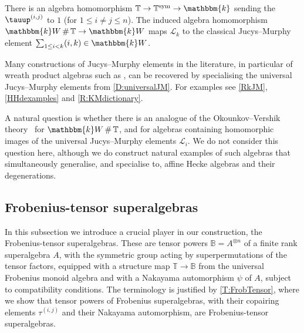 \documentclass[a4paper,11pt]{amsart}
\numberwithin{equation}{subsection}
\theoremstyle{definition}
\theoremstyle{theorem}
\theoremstyle{remark}
\newcommand\CL{\mathcal{L}}
\newcommand\Sym{W}
\newcommand\op{\operatorname}
\newcommand{\ttau}{\tauup}
\newcommand\kk{\mathbbm{k}}
\newcommand\Tos{\mathbb{T}}
\newcommand\Tosym{\mathbb{T}^{\op{sym}}}
\newcommand{\Bo}{\mathbb{B}}
\DeclareMathOperator\Smash{\#}
\begin{document}
\begin{Lemma}
There is an algebra homomorphism $\Tos\rightarrow \Tosym \rightarrow \kk$ sending the $\ttau^{(i,j)}$ to $1$ (for  $1\leq i\not= j\leq n$). The induced algebra homomorphism  $\kk\Sym\Smash\Tos\rightarrow\kk\Sym$ maps $\CL_k$ to the classical Jucys--Murphy element $\sum_{1\leq i<k}(i,k)\in\kk\Sym$.
 \end{Lemma}


\begin{Remark} Many constructions of Jucys--Murphy elements in the
  literature, in particular of wreath product algebras such as
  \cite{Pushkarev, wreathHecke, WanWang, KleshchevMuth},   can be recovered by specialising the universal
  Jucys--Murphy elements from \autoref{D:universalJM}. For
  examples see \autoref{RkJM}, \autoref{HHdexamples} and \autoref{R:KMdictionary}.
\end{Remark}

A natural question is whether there is an analogue of the Okounkov--Vershik
theory~\cite[\S3]{VObook} for $\kk\Sym\Smash\Tos$, and for algebras
containing homomorphic images of the universal Jucys--Murphy elements $\CL_i$.
We do not consider this question here, although we do construct natural
examples of such algebras that simultaneously generalise, and specialise
to, affine Hecke algebras and their degenerations.

\subsection{Frobenius-tensor superalgebras} \label{superstuffeasy}
In this subsection we introduce a crucial player in our construction, the Frobenius-tensor superalgebras. These are tensor powers
$\Bo=A^{\otimes n}$ of a finite rank superalgebra $A$, with the symmetric group acting by
superpermutations of the tensor factors, equipped with a structure map $\Tos\to\Bo$ from the
universal Frobenius monoid algebra and with a Nakayama automorphism $\psi$ of $A$, subject to
compatibility conditions. The terminology is justified by \autoref{T:FrobTensor}, where we show
that tensor powers of Frobenius superalgebras, with their copairing elements $\tau^{(i,j)}$ and their Nakayama
automorphism, are Frobenius-tensor superalgebras.
\end{document}
